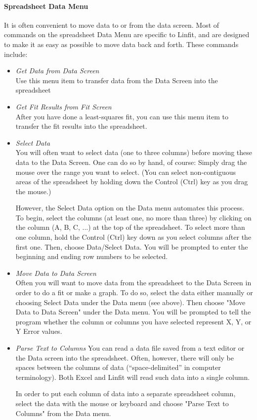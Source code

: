 \paragraph*{Spreadsheet Data Menu}

It is often convenient to move data to or from the data screen.  Most
of commands
on the spreadsheet Data Menu are specific to Linfit, and are designed
to make it as easy as possible to move data back and forth. These
commands include:

\begin{itemize}
\item {\em Get Data from Data Screen}\\
Use this menu item to transfer data from the Data Screen into the spreadsheet
%
\item {\em Get Fit Results from Fit Screen} \\
After you have done a least-squares fit, you can use this menu item to
transfer the fit results into the spreadsheet.
%
\item {\em Select Data} \\
You will often want to select data (one to three columns) before
moving these data to the Data Screen.  One can do so by hand, of
course: Simply drag the mouse over the range you want to select.  (You
can select non-contiguous areas of the spreadsheet by holding down the
Control (Ctrl) key as you drag the mouse.)

However, the Select Data option on the Data menu automates this
process.  To begin, select the columns (at least one, no more than
three) by clicking on the column (A, B, C, ...) at the top of the
spreadsheet.  To select more than one column, hold the Control (Ctrl)
key down as you select columns after the first one.  Then, choose
Data/Select Data.  You will be prompted to enter the beginning and
ending row numbers to be selected.
%
\item {\em Move Data to Data Screen} \\
Often you will want to move data from the spreadsheet to the Data
Screen in order to do a fit or make a graph.  To do so, select the
data either manually or choosing Select Data under the Data menu (see
above).  Then choose "Move Data to Data Screen" under the Data menu.
You will be prompted to tell the program whether the column or columns
you have selected represent X, Y, or Y Error values.
%
\item {\em Parse Text to Columns}
You can read a data file saved from a text editor or the Data screen
into the spreadsheet.  Often, however, there will only be spaces
between the columns of data (``space-delimited'' in computer terminology).
Both Excel and Linfit will read such data into a single column.

In order to put each column of data into a separate spreadsheet
column, select the data with the mouse or keyboard and choose "Parse
Text to Columns" from the Data menu.  \end{itemize}

